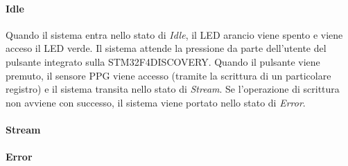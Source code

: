 \paragraph{Idle}
Quando il sistema entra nello stato di \textit{Idle}, il LED arancio viene spento e viene acceso il LED verde. Il sistema attende la pressione da parte dell'utente del pulsante integrato sulla STM32F4DISCOVERY. Quando il pulsante viene premuto, il sensore PPG viene accesso (tramite la scrittura di un particolare registro) e il sistema transita nello stato di \textit{Stream}. Se l'operazione di scrittura non avviene con successo, il sistema viene portato nello stato di \textit{Error}.
\paragraph{Stream}
\paragraph{Error}

\clearpage